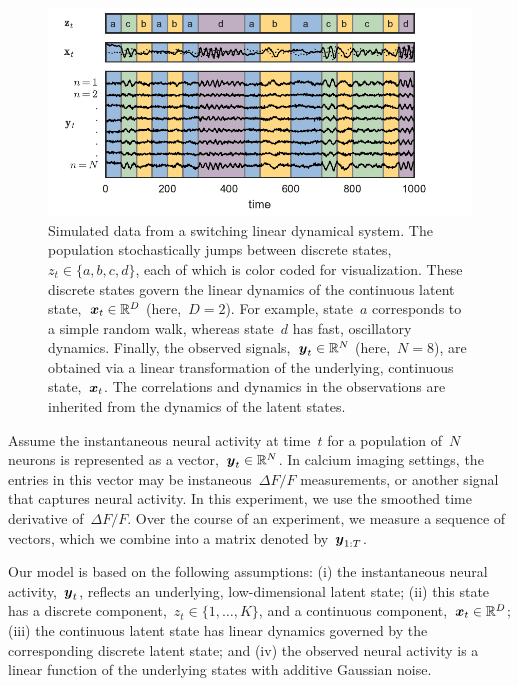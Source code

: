 \documentclass{article}
\begin{document}
\begin{figure}[t]
\centering%
\includegraphics[width=5.5in]{slds} 
\caption{Simulated data from a switching linear dynamical system.
The population stochastically jumps between discrete states,~$z_t \in \{a,b,c,d\}$,
each of which is color coded for visualization.
These discrete states govern the linear dynamics of the continuous latent 
state,~$\boldsymbol{x}_t \in \mathbb{R}^D$ (here,~$D=2$). For example, state~$a$ corresponds to a simple
random walk, whereas state~$d$ has fast, oscillatory dynamics. Finally,
the observed signals,~$\boldsymbol{y}_t \in \mathbb{R}^N$ (here,~$N=8$), are obtained via a linear 
transformation of the underlying, continuous state,~$\boldsymbol{x}_t$. The correlations
and dynamics in the observations are inherited from the dynamics of the
latent states.}
\vspace{-0.5cm}
\label{fig:slds_ex}
\end{figure}

Assume the instantaneous neural activity at time~$t$ for a population
of~$N$ neurons is represented as a vector,~$\boldsymbol{y}_t \in \mathbb{R}^N$. In
calcium imaging settings, the entries in this vector may be
instaneous~$\Delta F/F$ measurements, or another signal that captures
neural activity. In this experiment, we use the smoothed time
derivative of~$\Delta F/F$. Over the course of an experiment, we
measure a sequence of vectors, which we combine into a matrix denoted
by~$\boldsymbol{y}_{1:T}$.

Our model is based on the following assumptions: (i) the instantaneous
neural activity,~$\boldsymbol{y}_t$, reflects an underlying, low-dimensional
latent state; (ii) this state has a discrete component,~$z_t \in \{1, \ldots, K\}$,
and a continuous component,~$\boldsymbol{x}_t \in \mathbb{R}^D$; (iii) the continuous
latent state has linear dynamics governed by the corresponding discrete
latent state; and (iv) the observed neural activity is a linear function
of the underlying states with additive Gaussian noise.  
\end{document}
